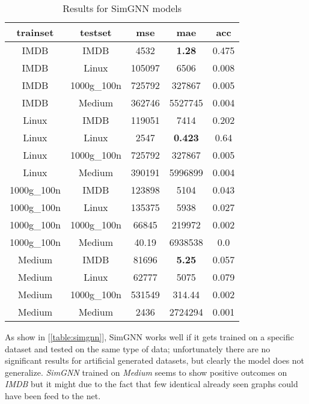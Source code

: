 \documentclass[../Thesis.tex]{subfiles}
\begin{document}
	\begin{table}[H]
		\centering
		\setlength\tabcolsep{4pt}
		\renewcommand{\arraystretch}{1.2}
		\begin{tabular}{c|c|c|c|c}
			\toprule
			\textbf{trainset} & \textbf{testset} & \textbf{mse} & \textbf{mae} & \textbf{acc} \\
			\midrule
			IMDB & IMDB & 4532 & \textbf{1.28} & 0.475 \\
			IMDB & Linux & 105097 & 6506 & 0.008 \\
			IMDB & 1000g\_100n & 725792 & 327867 & 0.005 \\
			IMDB & Medium & 362746 & 5527745 & 0.004 \\ \midrule
			Linux & IMDB & 119051 & 7414 & 0.202 \\
			Linux & Linux & 2547 & \textbf{0.423} & 0.64 \\
			Linux & 1000g\_100n & 725792 & 327867 & 0.005 \\
			Linux & Medium & 390191 & 5996899 & 0.004 \\ \midrule
			1000g\_100n & IMDB & 123898 & 5104 & 0.043 \\
			1000g\_100n & Linux & 135375 & 5938 & 0.027 \\
			1000g\_100n & 1000g\_100n & 66845 & 219972 & 0.002 \\
			1000g\_100n & Medium & 40.19 & 6938538 & 0.0 \\ \midrule
			Medium & IMDB & 81696 & \textbf{5.25} & 0.057 \\
			Medium & Linux & 62777 & 5075 & 0.079 \\
			Medium & 1000g\_100n & 531549 & 314.44 & 0.002 \\
			Medium & Medium & 2436 & 2724294 & 0.001 \\
			\bottomrule
		\end{tabular}
		\caption{Results for SimGNN models}
		\label{table:simgnn}
	\end{table}
	
	As show in [\autoref{table:simgnn}], SimGNN works well if it gets trained on a specific dataset and tested on the same type of data; unfortunately there are no significant results for artificial generated datasets, but clearly the model does not generalize. \emph{SimGNN} trained on \emph{Medium} seems to show positive outcomes on \emph{IMDB} but it might due to the fact that few identical already seen graphs could have been feed to the net.
	
\end{document}
